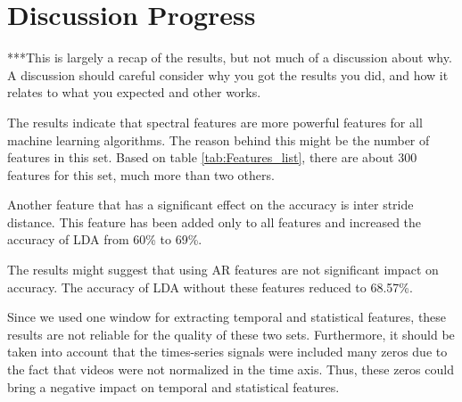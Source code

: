 \section{Discussion Progress}
***This is largely a recap of the results, but not much of a discussion about why.  A discussion should careful consider why you got the results you did, and how it relates to what you expected and other works.

The results indicate that spectral features are more powerful features for all machine learning algorithms. The reason behind this might be the number of features in this set. Based on table \ref{tab:Features_list}, there are about 300 features for this set, much more than two others.

Another feature that has a significant effect on the accuracy is inter stride distance. This feature has been added only to all features and increased the accuracy of LDA from 60\% to 69\%. 
 
The results might suggest that using AR features are not significant impact on accuracy. The accuracy of LDA without these features reduced to 68.57\%. 

Since we used one window for extracting temporal and statistical features, these results are not reliable for the quality of these two sets. Furthermore, it should be taken into account that the times-series signals were included many zeros due to the fact that videos were not normalized in the time axis. Thus, these zeros could bring a negative impact on temporal and statistical features.









